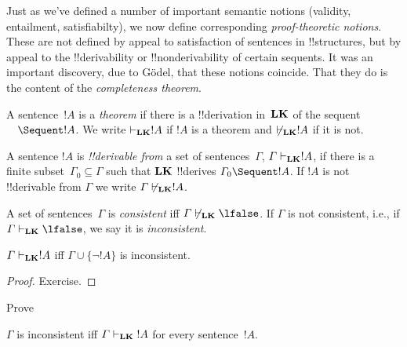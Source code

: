 \documentclass[../../include/open-logic-section]{subfiles}
\begin{document}

\begin{explain}
Just as we've defined a number of important semantic notions
(validity, entailment, satisfiabilty), we now define corresponding
\emph{proof-theoretic notions}. These are not defined by appeal to
satisfaction of sentences in !!{structure}s, but by appeal to the
!!{derivability} or !!{nonderivability} of certain sequents.  It was
an important discovery, due to G\"odel, that these notions coincide.
That they do is the content of the \emph{completeness theorem}.
\end{explain}

\begin{defn}[Theorems]
A sentence~$!A$ is a \emph{theorem} if there is a !!{derivation}
in~$\mathbf{LK}$ of the sequent $\quad \Sequent !A$. We write
$\Proves[\Log{LK}] !A$ if $!A$ is a theorem and $\Proves/[\Log{LK}]
!A$ if it is not.
\end{defn}

\begin{defn}[!!^{derivability}]
A sentence $!A$ is \emph{!!{derivable} from} a set of
sentences~$\Gamma$, $\Gamma \Proves[\Log{LK}] !A$, if there is a
finite subset~$\Gamma_0 \subseteq \Gamma$ such that $\mathbf{LK}$
!!{derive}s $\Gamma_0 \Sequent !A$.  If $!A$ is not !!{derivable} from
$\Gamma$ we write $\Gamma \Proves/[\Log{LK}] !A$.
\end{defn}

\begin{defn}[Consistency]
A set of sentences~$\Gamma$ is \emph{consistent} iff $\Gamma
\Proves/[\Log{LK}] \lfalse$.  If $\Gamma$ is not consistent, i.e., if
$\Gamma \Proves[\Log{LK}] \lfalse$, we say it is \emph{inconsistent}.
\end{defn}

\begin{prop}
$\Gamma \Proves[\Log{LK}] !A$ iff $\Gamma \cup \{\lnot !A\}$ is inconsistent.
\end{prop}

\begin{proof}
Exercise.
\end{proof}

\begin{prob}
Prove 
\end{prob}

\begin{prop}
$\Gamma$ is inconsistent iff $\Gamma \Proves[\Log{LK}] {!A}$ for every
  sentence~$!A$.
\end{prop}
\end{document}
